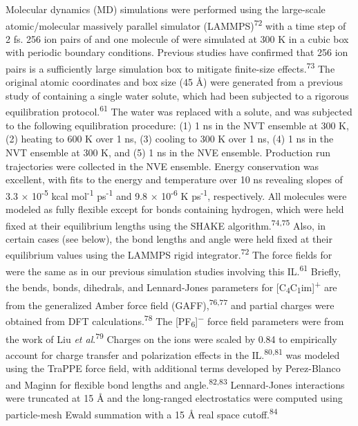 \documentclass[]{article}
\begin{document}
Molecular dynamics (MD) simulations were performed using the large-scale atomic/molecular massively parallel simulator (LAMMPS)\textsuperscript{72} with a time step of 2 fs. 256 ion pairs of \ce{[C4C1im][PF6]} and one molecule of  were simulated at 300 K in a cubic box with periodic boundary conditions. Previous studies have confirmed that 256 ion pairs is a sufficiently large simulation box to mitigate finite-size effects.\textsuperscript{73} The original atomic coordinates and box size (45 Å) were generated from a previous study of \ce{[C4C1im][PF6]} containing a single water solute, which had been subjected to a rigorous equilibration protocol.\textsuperscript{61} The water was replaced with a  solute, and was subjected to the following equilibration procedure: (1) 1 ns in the NVT ensemble at 300 K, (2) heating to 600 K over 1 ns, (3) cooling to 300 K over 1 ns, (4) 1 ns in the NVT ensemble at 300 K, and (5) 1 ns in the NVE ensemble. Production run trajectories were collected in the NVE ensemble. Energy conservation was excellent, with fits to the energy and temperature over 10 ns revealing slopes of 3.3 × 10\textsuperscript{-5} kcal mol\textsuperscript{-1} ps\textsuperscript{-1} and 9.8 × 10\textsuperscript{-6} K ps\textsuperscript{-1}, respectively. All molecules were modeled as fully flexible except for bonds containing hydrogen, which were held fixed at their equilibrium lengths using the SHAKE algorithm.\textsuperscript{74,75} Also, in certain cases (see below), the  bond lengths and angle were held fixed at their equilibrium values using the LAMMPS rigid integrator.\textsuperscript{72} The force fields for \ce{[C4C1im][PF6]} were the same as in our previous simulation studies involving this IL.\textsuperscript{61} Briefly, the bends, bonds, dihedrals, and Lennard-Jones parameters for {[}C\textsubscript{4}C\textsubscript{1}im{]}\textsuperscript{+} are from the generalized Amber force field (GAFF),\textsuperscript{76,77} and partial charges were obtained from DFT calculations.\textsuperscript{78} The {[}PF\textsubscript{6}{]}\textsuperscript{−} force field parameters were from the work of Liu \emph{et al}.\textsuperscript{79} Charges on the ions were scaled by 0.84 to empirically account for charge transfer and polarization effects in the IL.\textsuperscript{80,81}  was modeled using the TraPPE force field, with additional terms developed by Perez-Blanco and Maginn for flexible bond lengths and angle.\textsuperscript{82,83} Lennard-Jones interactions were truncated at 15 Å and the long-ranged electrostatics were computed using particle-mesh Ewald summation with a 15 Å real space cutoff.\textsuperscript{84}
\end{document}
